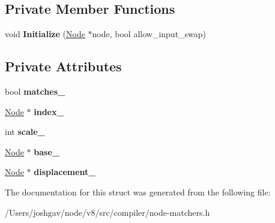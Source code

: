 \subsection*{Private Member Functions}
\begin{DoxyCompactItemize}
\item 
void {\bfseries Initialize} (\hyperlink{classv8_1_1internal_1_1compiler_1_1_node}{Node} $\ast$node, bool allow\+\_\+input\+\_\+swap)\hypertarget{structv8_1_1internal_1_1compiler_1_1_base_with_index_and_displacement_matcher_a1ee5d7344acb7f10fdbcfbbd8a33bdc7}{}\label{structv8_1_1internal_1_1compiler_1_1_base_with_index_and_displacement_matcher_a1ee5d7344acb7f10fdbcfbbd8a33bdc7}

\end{DoxyCompactItemize}
\subsection*{Private Attributes}
\begin{DoxyCompactItemize}
\item 
bool {\bfseries matches\+\_\+}\hypertarget{structv8_1_1internal_1_1compiler_1_1_base_with_index_and_displacement_matcher_a003f4f3992eb43e534f064b6df591924}{}\label{structv8_1_1internal_1_1compiler_1_1_base_with_index_and_displacement_matcher_a003f4f3992eb43e534f064b6df591924}

\item 
\hyperlink{classv8_1_1internal_1_1compiler_1_1_node}{Node} $\ast$ {\bfseries index\+\_\+}\hypertarget{structv8_1_1internal_1_1compiler_1_1_base_with_index_and_displacement_matcher_a8c0064625d86ef0ee1aaba32090f7d4b}{}\label{structv8_1_1internal_1_1compiler_1_1_base_with_index_and_displacement_matcher_a8c0064625d86ef0ee1aaba32090f7d4b}

\item 
int {\bfseries scale\+\_\+}\hypertarget{structv8_1_1internal_1_1compiler_1_1_base_with_index_and_displacement_matcher_a430d8e308b410fbe688f0306473b48fe}{}\label{structv8_1_1internal_1_1compiler_1_1_base_with_index_and_displacement_matcher_a430d8e308b410fbe688f0306473b48fe}

\item 
\hyperlink{classv8_1_1internal_1_1compiler_1_1_node}{Node} $\ast$ {\bfseries base\+\_\+}\hypertarget{structv8_1_1internal_1_1compiler_1_1_base_with_index_and_displacement_matcher_ae87089df9e7bf1b79dac2ea9d264c1c9}{}\label{structv8_1_1internal_1_1compiler_1_1_base_with_index_and_displacement_matcher_ae87089df9e7bf1b79dac2ea9d264c1c9}

\item 
\hyperlink{classv8_1_1internal_1_1compiler_1_1_node}{Node} $\ast$ {\bfseries displacement\+\_\+}\hypertarget{structv8_1_1internal_1_1compiler_1_1_base_with_index_and_displacement_matcher_a796c1bdac7efa657758b3d9233149929}{}\label{structv8_1_1internal_1_1compiler_1_1_base_with_index_and_displacement_matcher_a796c1bdac7efa657758b3d9233149929}

\end{DoxyCompactItemize}


The documentation for this struct was generated from the following file\+:\begin{DoxyCompactItemize}
\item 
/\+Users/joshgav/node/v8/src/compiler/node-\/matchers.\+h\end{DoxyCompactItemize}

